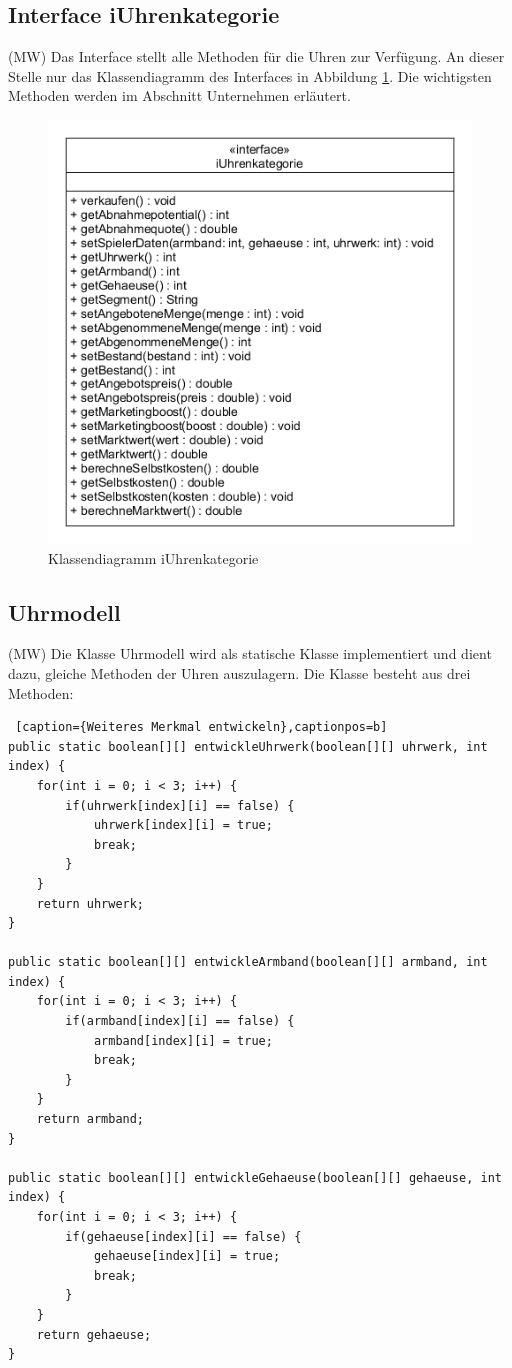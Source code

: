 \subsection{Interface iUhrenkategorie}
(MW) Das Interface stellt alle Methoden für die Uhren zur Verfügung. An dieser Stelle nur das Klassendiagramm des Interfaces in Abbildung \ref{fig:abb3}. Die wichtigsten Methoden werden im Abschnitt Unternehmen erläutert.

\begin{figure}[!h]
	\centering
	\includegraphics[scale=0.7]{img/iUhrenkategorie.png} 
	\caption{Klassendiagramm iUhrenkategorie} \label{fig:abb3}
\end{figure}

\subsection{Uhrmodell}
(MW) Die Klasse Uhrmodell wird als statische Klasse implementiert und dient dazu, gleiche Methoden der Uhren auszulagern. Die Klasse besteht aus drei Methoden: 

\lstset{language=Java}
\begin{lstlisting} [caption={Weiteres Merkmal entwickeln},captionpos=b]
public static boolean[][] entwickleUhrwerk(boolean[][] uhrwerk, int index) {
	for(int i = 0; i < 3; i++) {
		if(uhrwerk[index][i] == false) {
			uhrwerk[index][i] = true;
			break;
		}
	}
	return uhrwerk;
}

public static boolean[][] entwickleArmband(boolean[][] armband, int index) {
	for(int i = 0; i < 3; i++) {
		if(armband[index][i] == false) {
			armband[index][i] = true;
			break;
		}
	}
	return armband;
}

public static boolean[][] entwickleGehaeuse(boolean[][] gehaeuse, int index) {
	for(int i = 0; i < 3; i++) {
		if(gehaeuse[index][i] == false) {
			gehaeuse[index][i] = true;
			break;
		}
	}
	return gehaeuse;
}	
\end{lstlisting}

